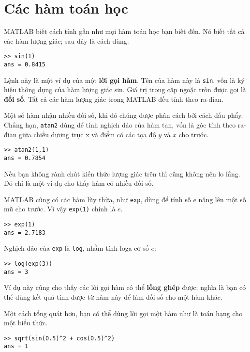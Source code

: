 \documentclass[12pt]{book}
\begin{document}
\section{Các hàm toán học}

MATLAB biết cách tính gần như mọi hàm toán học bạn biết đến. Nó
biết tất cả các hàm lượng giác; sau đây là cách dùng:

\begin{verbatim}
>> sin(1)
ans = 0.8415
\end{verbatim}

Lệnh này là một ví dụ của một {\bf lời gọi hàm}. Tên của hàm này là
{\tt sin}, vốn là ký hiệu thông dụng của hàm lượng giác sin. Giá trị trong
cặp ngoặc tròn được gọi là {\bf đối số}. Tất cả các hàm lượng giác 
trong MATLAB đều tính theo ra-đian.

Một số hàm nhận nhiều đối số, khi đó chúng được phân cách bởi cách
dấu phẩy. Chẳng hạn, {\tt atan2} dùng để tính nghịch đảo của hàm tan,
vốn là góc tính theo ra-đian giữa chiều dương trục x và điểm có các
tọa độ $y$ và $x$ cho trước.

\begin{verbatim}
>> atan2(1,1)
ans = 0.7854
\end{verbatim}

Nếu bạn không rành chút kiến thức lượng giác trên thì cũng không nên
lo lắng. Đó chỉ là một ví dụ cho thấy hàm có nhiều đối số.

MATLAB cũng có các hàm lũy thừa, như {\tt exp}, dùng để tính số
$e$ nâng lên một số mũ cho trước. Vì vậy {\tt exp(1)} chính là $e$.

\begin{verbatim}
>> exp(1)
ans = 2.7183
\end{verbatim}

Nghịch đảo của {\tt exp} là {\tt log}, nhằm tính loga cơ số $e$:

\begin{verbatim}
>> log(exp(3))
ans = 3
\end{verbatim}

Ví dụ này cũng cho thấy các lời gọi hàm có thể {\bf lồng ghép} được;
nghĩa là bạn có thể dùng kết quả tính được từ hàm này để làm đối số
cho một hàm khác.

Một cách tổng quát hơn, bạn có thể dùng lời gọi một hàm như là toán
hạng cho một biểu thức.

\begin{verbatim}
>> sqrt(sin(0.5)^2 + cos(0.5)^2)
ans = 1
\end{verbatim}
\end{document}
